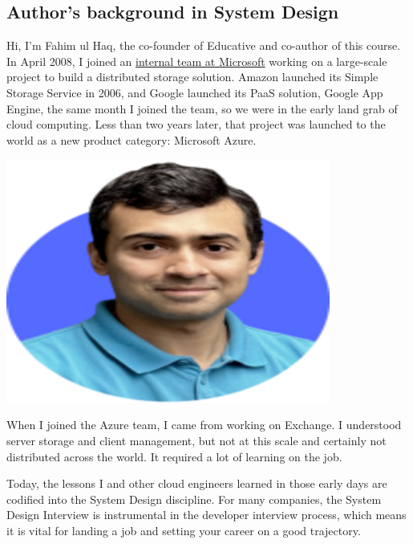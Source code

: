 \subsection{Author's background in System Design}\label{gIyZLoEnzqAWz9PwuDQ-5}

\noindent
\begin{minipage}[t]{0.48\textwidth}
Hi, I'm Fahim ul Haq, the co-founder of Educative and co-author of this course. In April 2008, I joined an \href{https://www.educative.io/blog/25-years-of-developer-interviews}{internal team at Microsoft} working on a large-scale project to build a distributed storage solution. Amazon launched its Simple Storage Service in 2006, and Google launched its PaaS solution, Google App Engine, the same month I joined the team, so we were in the early land grab of cloud computing. Less than two years later, that project was launched to the world as a new product category: Microsoft Azure.
\end{minipage}
\hfill
\begin{minipage}[t]{0.48\textwidth}
\includegraphics[width=0.8\textwidth]{Images/chapter_1/section_4771234193080320/4700286249992192.png}
\end{minipage}

When I joined the Azure team, I came from working on Exchange. I understood server storage and client management, but not at this scale and certainly not distributed across the world. It required a lot of learning on the job.

Today, the lessons I and other cloud engineers learned in those early days are codified into the System Design discipline. For many companies, the System Design Interview is instrumental in the developer interview process, which means it is vital for landing a job and setting your career on a good trajectory.


